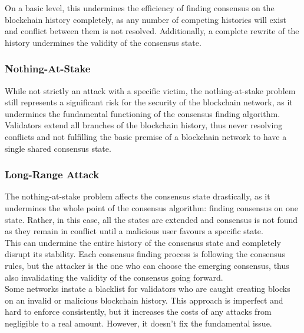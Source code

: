 \documentclass[11pt,a4paper,draft]{article}
\begin{document}
On a basic level, this undermines the efficiency of finding consensus on the blockchain history completely, as any number of competing histories will exist and conflict between them is not resolved. Additionally, a complete rewrite of the history undermines the validity of the consensus state.\\

\subsubsection{Nothing-At-Stake}

While not strictly an attack with a specific victim, the nothing-at-stake problem still represents a significant risk for the security of the blockchain network, as it undermines the fundamental functioning of the consensus finding algorithm. Validators extend all branches of the blockchain history, thus never resolving conflicts and not fulfilling the basic premise of a blockchain network to have a single shared consensus state.\\

\subsubsection{Long-Range Attack}


The nothing-at-stake problem affects the consensus state drastically, as it undermines the whole point of the consensus algorithm: finding consensus on one state. Rather, in this case, all the states are extended and consensus is not found as they remain in conflict until a malicious user favours a specific state.\\

This can undermine the entire history of the consensus state and completely disrupt its stability. Each consensus finding process is following the consensus rules, but the attacker is the one who can choose the emerging consensus, thus also invalidating the validity of the consensus going forward.\\


Some networks instate a blacklist for validators who are caught creating blocks on an invalid or malicious blockchain history. This approach is imperfect and hard to enforce consistently, but it increases the costs of any attacks from negligible to a real amount. However, it doesn't fix the fundamental issue.\\
\end{document}
